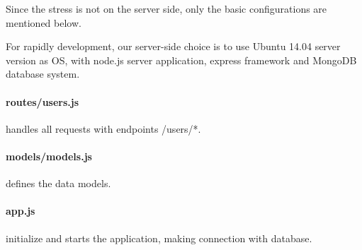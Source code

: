 Since the stress is not on the server side, only the basic configurations are mentioned below.

For rapidly development, our server-side choice is to use Ubuntu 14.04 server version as OS, with node.js server application, express framework and MongoDB database system. 

\paragraph{routes/users.js} handles all requests with endpoints /users/*.
\paragraph{models/models.js} defines the data models.
\paragraph{app.js} initialize and starts the application, making connection with database.